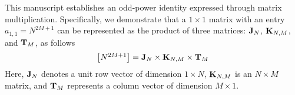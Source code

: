 This manuscript establishes an odd-power identity expressed through matrix multiplication.
Specifically, we demonstrate that a \(1 \times 1\) matrix with an entry \(a_{1,1} = N^{2M+1}\)
can be represented as the product of three matrices: \({\mathbf{J}} \sb{N}\),
\({\mathbf{K}} \sb{N, M}\), and \({\mathbf{T}} \sb{M}\), as follows
\[
    \begin{bmatrix}
        N^{2M+1}
    \end{bmatrix} = {\mathbf{J}} \sb{N} \times {\mathbf{K}} \sb{N, M} \times {\mathbf{T}} \sb{M}
\]
Here, \({\mathbf{J}} \sb{N}\) denotes a unit row vector of dimension \(1 \times N\), \({\mathbf{K}} \sb{N, M}\)
is an \(N \times M\) matrix,
and \({\mathbf{T}} \sb{M}\) represents a column vector of dimension \(M \times 1\).
